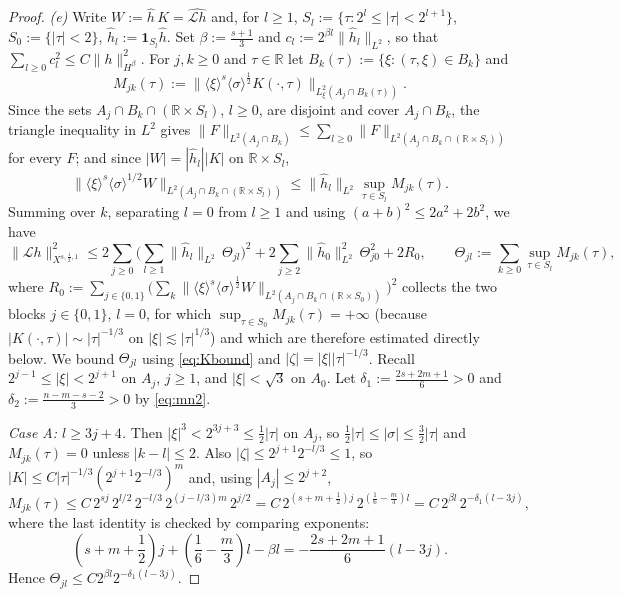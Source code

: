 \documentclass[10pt,reqno]{amsart}
\theoremstyle{remark}
\numberwithin{equation}{section}
\newcommand{\R}{\mathbb R}
\newcommand{\lan}{\langle}
\newcommand{\ran}{\rangle}
\newcommand{\Lc}{\mathcal{L}}
\newcommand{\sig}{\sigma}
\begin{document}
\begin{proof}
\emph{(e)} Write $W:=\widehat h\,K=\widehat{\Lc h}$ and, for $l\ge1$, $S_l:=\{\tau:2^l\le|\tau|<2^{l+1}\}$, $S_0:=\{|\tau|<2\}$, $\widehat h_l:=\mathbf 1_{S_l}\widehat h$. Set $\beta:=\frac{s+1}3$ and $c_l:=2^{\beta l}\|\widehat h_l\|_{L^2}$, so that $\sum_{l\ge0}c_l^2\le C\|h\|^2_{H^\beta}$. For $j,k\ge0$ and $\tau\in\R$ let $B_k(\tau):=\{\xi:(\tau,\xi)\in B_k\}$ and
$$M_{jk}(\tau):=\|\lan\xi\ran^s\lan\sig\ran^{\frac12}K(\cdot,\tau)\|_{L^2_\xi(A_j\cap B_k(\tau))}.$$
Since the sets $A_j\cap B_k\cap(\R\times S_l)$, $l\ge0$, are disjoint and cover $A_j\cap B_k$, the triangle inequality in $L^2$ gives $\|F\|_{L^2(A_j\cap B_k)}\le\sum_{l\ge0}\|F\|_{L^2(A_j\cap B_k\cap(\R\times S_l))}$ for every $F$; and since $|W|=|\widehat h_l||K|$ on $\R\times S_l$, $$\|\lan\xi\ran^s\lan\sig\ran^{1/2}W\|_{L^2(A_j\cap B_k\cap(\R\times S_l))}\le\|\widehat h_l\|_{L^2}\sup_{\tau\in S_l}M_{jk}(\tau).$$ Summing over $k$, separating $l=0$ from $l\ge1$ and using $(a+b)^2\le2a^2+2b^2$, we have
\begin{equation}\label{eq:assemble}
\|\Lc h\|_{X^{s,\frac12,1}}^2\le 2\sum_{j\ge0}\Big(\sum_{l\ge1}\|\widehat h_l\|_{L^2}\,\Theta_{jl}\Big)^2+2\sum_{j\ge2}\|\widehat h_0\|_{L^2}^2\,\Theta_{j0}^2+2R_0,\qquad \Theta_{jl}:=\sum_{k\ge0}\sup_{\tau\in S_l}M_{jk}(\tau),
\end{equation}
where $R_0:=\sum_{j\in\{0,1\}}\big(\sum_k\|\lan\xi\ran^s\lan\sig\ran^{\frac12}W\|_{L^2(A_j\cap B_k\cap(\R\times S_0))}\big)^2$ collects the two blocks $j\in\{0,1\}$, $l=0$, for which $\sup_{\tau\in S_0}M_{jk}(\tau)=+\infty$ (because $|K(\cdot,\tau)|\sim|\tau|^{-1/3}$ on $|\xi|\lesssim|\tau|^{1/3}$) and which are therefore estimated directly below. We bound $\Theta_{jl}$ using \eqref{eq:Kbound} and $|\zeta|=|\xi||\tau|^{-1/3}$. Recall $2^{j-1}\le|\xi|<2^{j+1}$ on $A_j$, $j\ge1$, and $|\xi|<\sqrt3$ on $A_0$. Let $\delta_1:=\frac{2s+2m+1}6>0$ and $\delta_2:=\frac{n-m-s-2}3>0$ by \eqref{eq:mn2}.

\emph{Case A: $l\ge3j+4$.} Then $|\xi|^3<2^{3j+3}\le\frac12|\tau|$ on $A_j$, so $\frac12|\tau|\le|\sig|\le\frac32|\tau|$ and $M_{jk}(\tau)=0$ unless $|k-l|\le2$. Also $|\zeta|\le 2^{j+1}2^{-l/3}\le1$, so $|K|\le C|\tau|^{-1/3}(2^{j+1}2^{-l/3})^m$ and, using $|A_j|\le2^{j+2}$,
$$M_{jk}(\tau)\le C\,2^{sj}\,2^{l/2}\,2^{-l/3}\,2^{(j-l/3)m}\,2^{j/2}=C\,2^{(s+m+\frac12)j}\,2^{(\frac16-\frac m3)l}=C\,2^{\beta l}\,2^{-\delta_1(l-3j)} ,$$
where the last identity is checked by comparing exponents: $$(s+m+\frac12)j+(\frac16-\frac m3)l-\beta l=-\frac{2s+2m+1}{6}(l-3j).$$ Hence $\Theta_{jl}\le C2^{\beta l}2^{-\delta_1(l-3j)}$.


\end{proof}
\end{document}

